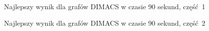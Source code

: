 \documentclass[12pt, a4paper]{article}
\begin{document}
\begin{figure}[H]
  \begin{center}
  \end{center}
  \caption{Najlepszy wynik dla grafów DIMACS w czasie 90 sekund, część 1}
  \label{fig:dimacs-best-part1}
\end{figure}

\begin{figure}[H]
  \begin{center}
  \end{center}
  \caption{Najlepszy wynik dla grafów DIMACS w czasie 90 sekund, część 2}
  \label{fig:dimacs-best-part2}
\end{figure}
\end{document}
